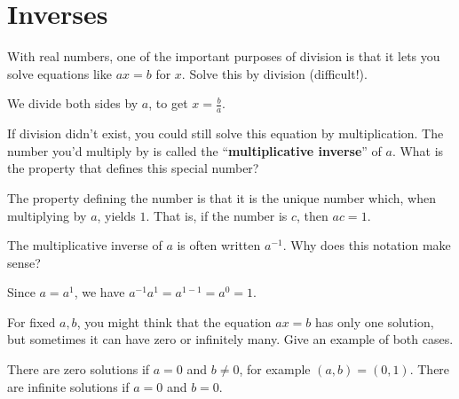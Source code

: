 \documentclass[../key.tex]{subfiles}
\begin{document}
\section{Inverses}

\begin{outer_problem}[start=1]
\item
\end{outer_problem}

\begin{inner_problem}[start=1]
\item With real numbers, one of the important purposes of division is that it lets you solve equations like $ax=b$ for $x$. Solve this by division (difficult!).
\end{inner_problem}

We divide both sides by $a$, to get $x=\frac{b}{a}$.

\begin{inner_problem}
\item If division didn't exist, you could still solve this equation by multiplication. The number you'd multiply by is called the ``\textbf{multiplicative inverse}'' of $a$. What is the property that defines this special number?
\end{inner_problem}

The property defining the number is that it is the unique number which, when multiplying by $a$, yields $1$. That is, if the number is $c$, then $ac=1$.

\begin{inner_problem}
\item The multiplicative inverse of $a$ is often written $a^{-1}$. Why does this notation make sense?
\end{inner_problem}

Since $a=a^1$, we have $a^{-1}a^1=a^{1-1}=a^0=1$.

\begin{outer_problem}
\item
\end{outer_problem}

\begin{inner_problem}[start=1]
\item For fixed $a,b$, you might think that the equation $ax=b$ has only one solution, but sometimes it can have zero or infinitely many. Give an example of both cases.
\end{inner_problem}

There are zero solutions if $a=0$ and $b\neq 0$, for example $(a,b)=(0,1)$. There are infinite solutions if $a=0$ and $b=0$.
\end{document}
